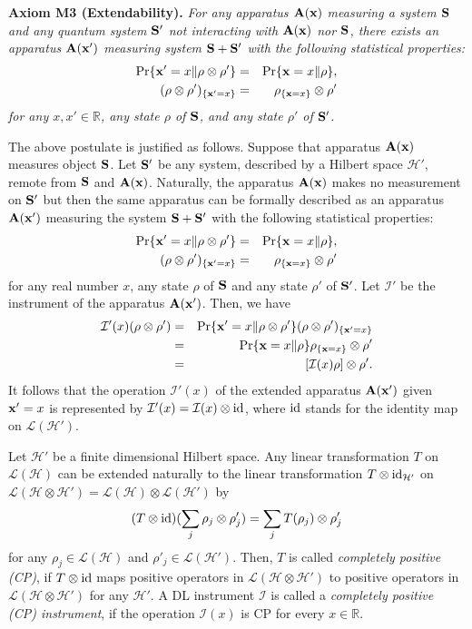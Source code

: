 \documentclass[12pt]{article}
\newcommand{\beq}{\begin{equation}}
\newcommand{\eeq}{\end{equation}}
\newcommand{\beqa}{\begin{eqnarray}}
\newcommand{\eeqa}{\end{eqnarray}}
\newcommand{\bA}{{\bf A}}
\newcommand{\bS}{{\bf S}}
\newcommand{\cH}{{\mathcal H}}
\newcommand{\cI}{{\mathcal I}}
\newcommand{\cL}{{\mathcal L}}
\newcommand{\nn}{\nonumber}
\newcommand{\rh}{\rho}
\newcommand{\tc}{\cL}
\newcommand{\bx}{{\bf x}}
\newcommand{\R}{\mathbb{R}}
\newcommand{\id}{{\rm id}}
\begin{document}
{\bf Axiom M3 (Extendability).}
{\em For any apparatus $\bA(\bx)$ measuring a system $\bS$
and any quantum system $\bS'$ not interacting with $\bA(\bx)$ 
nor $\bS$,  there exists an apparatus $\bA(\bx')$ measuring system
$\bS+\bS'$  with the following statistical properties:
\beqa\label{eq:ex-1}
\Pr\{\bx'=x\|\rh\otimes\rh'\}
&=&
\Pr\{\bx=x\|\rh\},\\
(\rh\otimes\rh')_{\{\bx'=x\}}&=&\rh_{\{\bx=x\}}\otimes
\rh'
\label{eq:ex-2}
\eeqa
for any $x,x'\in \R$, any state $\rh$ of $\bS$, 
and any state $\rh'$ of $\bS'$.}
\bigskip



The above postulate is justified as follows.
Suppose that apparatus $\bA(\bx)$ measures object $\bS$.
Let $\bS'$ be any system, described by a Hilbert space $\cH'$, 
remote from $\bS$ and
$\bA(\bx)$.
Naturally, the apparatus $\bA(\bx)$ makes no measurement on $\bS'$
but then the same apparatus can be formally described 
as an apparatus $\bA(\bx')$ measuring 
the system $\bS+\bS'$ with the following statistical properties:
\beqa
\Pr\{\bx'=x\|\rh\otimes\rh'\}
&=&
\Pr\{\bx=x\|\rh\},\\
(\rh\otimes\rh')_{\{\bx'=x\}}&=&\rh_{\{\bx=x\}}\otimes
\rh'
\eeqa
for any real number $x$, any state $\rh$ of $\bS$ and any state $\rh'$ of
$\bS'$. 
Let $\cI'$ be the instrument of the apparatus $\bA(\bx')$.
Then, we have
\beqa
\cI'(x)(\rh\otimes\rh')
&=&\Pr\{\bx'=x\|\rh\otimes\rh'\}(\rh\otimes\rh')_{\{\bx'=x\}}\nn\\
&=&\Pr\{\bx=x\|\rh\}\rh_{\{\bx=x\}}\otimes\rh'\nn\\
&=&[\cI(x)\rh]\otimes \rh'.
\eeqa
It follows that the operation $\cI'(x)$ of the extended apparatus
$\bA(\bx')$ given  $\bx'=x$ is represented by  
$\cI'(x)=\cI(x)\otimes \id $, where $\id$ stands for the identity map on $\cL(\cH')$.

Let $\cH'$ be a finite dimensional Hilbert space.
Any linear transformation $T$ on $\tc(\cH)$
can be extended naturally to the linear transformation $T\otimes {\rm id}_{\cH'}$
on  $\tc(\cH\otimes\cH')=\tc(\cH)\otimes\cL(\cH')$
by
\beq
(T\otimes \id)(\sum_{j}\rh_{j}\otimes \rh'_{j})
=\sum_{j}T(\rh_{j})\otimes\rh'_{j}
\eeq
for any $\rh_{j}\in\cL(\cH)$ and $\rh'_{j}\in\tc(\cH')$.
Then, $T$ is called 
{\em completely positive (CP)}, if $T\otimes \id$ maps
positive operators in $\cL(\cH\otimes\cH')$ to positive
operators in  $\cL(\cH\otimes\cH')$ for any $\cH'$.
A DL instrument $\cI$ is called a {\em completely positive (CP) instrument},
if the operation $\cI(x)$ is CP for every $x\in\R$.
\end{document}
